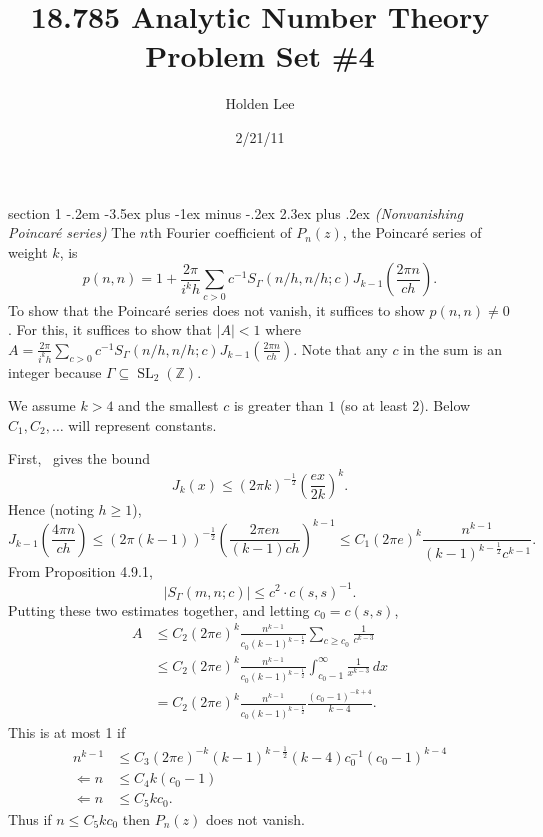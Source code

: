 \documentclass[12pt]{article}
\makeatletter
\theoremstyle{norm}
\newtheorem{lem}[thm]{Lemma}
\newcommand{\Z}[0]{\mathbb{Z}}
\newcommand{\rc}[1]{\frac{1}{#1}}
\newcommand{\subeq}[0]{\subseteq}
\newcommand{\Ga}[0]{\Gamma}
\newcommand{\pa}[1]{\left( {#1} \right)}
\newcommand{\SL}{\operatorname{SL}}
\newcommand{\pf}[2]{\pa{\frac{#1}{#2}}}
\newenvironment{problem}{\@startsection
       {section}
       {1}
       {-.2em}
       {-3.5ex plus -1ex minus -.2ex}
       {2.3ex plus .2ex}
       {\pagebreak[3]%
       \large\bf\noindent{Problem }
       }
       }
       {%
       }
\makeatother
\begin{document}
\title{18.785 Analytic Number Theory Problem Set \#4}%
\author{Holden Lee}
\date{2/21/11}%
\maketitle
\thispagestyle{empty}

\begin{problem}{\it (Nonvanishing Poincar\'e series)}
The $n$th Fourier coefficient of $P_n(z)$, the Poincar\'e series of weight $k$, is
\[
p(n,n)=1+\frac{2\pi}{i^kh}\sum_{c>0} c^{-1}S_{\Ga}(n/h,n/h;c) J_{k-1}\pf{2\pi n}{ch}.
\]
To show that the Poincar\'e series does not vanish, it suffices to show $p(n,n)\neq 0$. For this, it suffices to show that $|A|<1$ where $A=\frac{2\pi}{i^kh}\sum_{c>0} c^{-1}S_{\Ga}(n/h,n/h;c) J_{k-1}\pf{2\pi n}{ch}$. Note that any $c$ in the sum is an integer because $\Ga\subeq \SL_2(\Z)$.

We assume $k> 4$ and the smallest $c$ is greater than $1$ (so at least 2). Below $C_1,C_2,\ldots$ will represent constants.

First,~\cite[4.1]{rankin} gives the bound
\[
J_{k}(x)\leq (2\pi k)^{ -\rc 2}
\pf{ex}{2k}^k.
\]
Hence (noting $h\ge 1$),
\[
J_{k-1}\pf{4\pi n}{ch}\le
(2\pi(k-1))^{-\rc 2} \pf{2\pi en}{(k-1)ch}^{k-1}
\le C_1(2\pi e)^k\frac{n^{k-1}}{(k-1)^{k-\rc 2}c^{k-1}}.
\]
From Proposition 4.9.1,
\[
|S_{\Ga}(m,n;c)|\leq c^2\cdot c(s,s)^{-1}.
\]
Putting these two estimates together, and letting $c_0=c(s,s)$,
\begin{align}
\label{c0sum}
A& \le C_2(2\pi e)^k \frac{n^{k-1}}{c_0(k-1)^{k-\rc 2}}
\sum_{c\ge c_0}\rc{c^{k-3}}\\
\nonumber 
&\le C_2(2\pi e)^k \frac{n^{k-1}}{c_0(k-1)^{k-\rc 2}}\int_{c_0-1}^{\infty}\rc{x^{k-3}}\,dx\\
\nonumber
&=C_2(2\pi e)^k \frac{n^{k-1}}{c_0(k-1)^{k-\rc 2}}\frac{(c_0-1)^{-k+4}}{k-4}.
\end{align}
This is at most 1 if
\begin{align*}
n^{k-1}&\le C_3(2\pi e)^{-k}(k-1)^{k-\rc 2}(k-4)c_0^{-1}(c_0-1)^{k-4}\\
\Leftarrow
n&\le C_4k(c_0-1)\\
\Leftarrow 
n&\le C_5kc_0.
\end{align*}
Thus if $n\le C_5kc_0$ then $P_n(z)$ does not vanish.


\end{problem}
\end{document}
